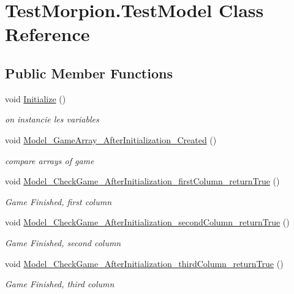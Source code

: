 \hypertarget{class_test_morpion_1_1_test_model}{}\section{Test\+Morpion.\+Test\+Model Class Reference}
\label{class_test_morpion_1_1_test_model}
\subsection*{Public Member Functions}
\begin{DoxyCompactItemize}
\item 
void \hyperlink{class_test_morpion_1_1_test_model_aa145a204885e5917286e8a8f9e956574}{Initialize} ()
\begin{DoxyCompactList}\small\item\em on instancie les variables \end{DoxyCompactList}\item 
void \hyperlink{class_test_morpion_1_1_test_model_a7cbfc6130c15ed728db69ff60b698301}{Model\+\_\+\+Game\+Array\+\_\+\+After\+Initialization\+\_\+\+Created} ()
\begin{DoxyCompactList}\small\item\em compare arrays of game \end{DoxyCompactList}\item 
void \hyperlink{class_test_morpion_1_1_test_model_a9f6539218394bd4323af18e98b8c64f9}{Model\+\_\+\+Check\+Game\+\_\+\+After\+Initialization\+\_\+first\+Column\+\_\+return\+True} ()
\begin{DoxyCompactList}\small\item\em Game Finished, first column \end{DoxyCompactList}\item 
void \hyperlink{class_test_morpion_1_1_test_model_ad80074dbd1f14b178eb5d7f03555d9dd}{Model\+\_\+\+Check\+Game\+\_\+\+After\+Initialization\+\_\+second\+Column\+\_\+return\+True} ()
\begin{DoxyCompactList}\small\item\em Game Finished, second column \end{DoxyCompactList}\item 
void \hyperlink{class_test_morpion_1_1_test_model_a30bb49a80c2eca7a921b7360a21f6ff9}{Model\+\_\+\+Check\+Game\+\_\+\+After\+Initialization\+\_\+third\+Column\+\_\+return\+True} ()
\begin{DoxyCompactList}\small\item\em Game Finished, third column \end{DoxyCompactList}\item 

\end{DoxyCompactItemize}
